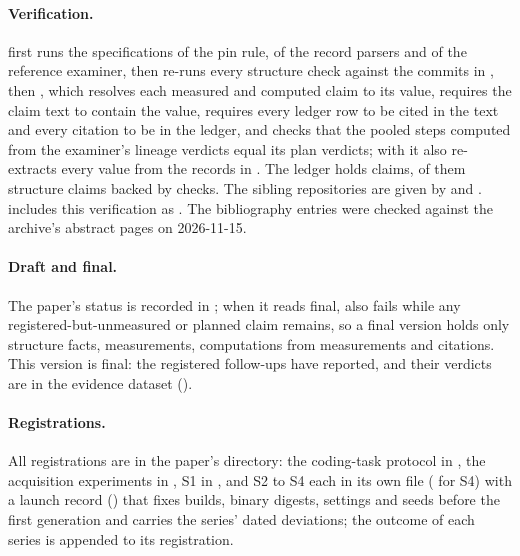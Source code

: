 \paragraph{Verification.}  first runs the specifications of the pin rule, of the
record parsers and of the reference examiner, then re-runs every structure check against the commits
in , then , which resolves each measured
and computed claim to its value, requires the claim text to contain the value, requires every ledger
row to be cited in the text and every citation to be in the ledger, and checks that the pooled steps
computed from the examiner's lineage verdicts equal its plan verdicts; with  it
also re-extracts every value from the records in . The ledger holds \mLedgerClaims{}
claims, \mLedgerStructure{} of them structure claims backed by \mLedgerChecks{} checks. The sibling
repositories are given by  and .  includes this
verification as . The bibliography entries were checked against the archive's
abstract pages on 2026-11-15.

\paragraph{Draft and final.} The paper's status is recorded in ; when it reads
final,  also fails while any registered-but-unmeasured or planned claim
remains, so a final version holds only structure facts, measurements, computations from measurements
and citations. This version is final: the registered follow-ups have reported, and their verdicts are in
the evidence dataset ().

\paragraph{Registrations.} All registrations are in the paper's  directory: the
coding-task protocol in , the acquisition experiments in ,
S1 in , and S2 to S4 each in its own file ( for
S4) with a launch record () that fixes builds, binary digests, settings and
seeds before the first generation and carries the series' dated deviations; the outcome of each series
is appended to its registration.

